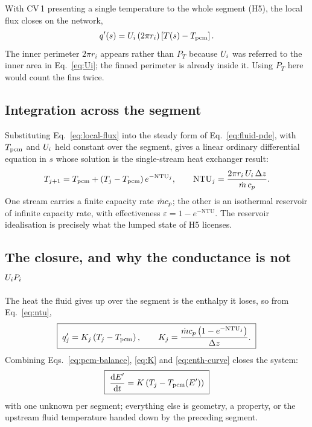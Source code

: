 With CV\,1 presenting a single temperature to the whole segment (H5), the local
flux closes on the network,
\begin{equation}
  q'(s) = U_{i}\,(2\pi r_{i})\left[T(s)-T_{\mathrm{pcm}}\right].
  \label{eq:local-flux}
\end{equation}
The inner perimeter $2\pi r_{i}$ appears rather than $P_{T}$ because $U_{i}$ was
referred to the inner area in Eq.~\eqref{eq:Ui}; the finned perimeter is already
inside it. Using $P_{T}$ here would count the fins twice.

\subsection{Integration across the segment}

Substituting Eq.~\eqref{eq:local-flux} into the steady form of
Eq.~\eqref{eq:fluid-pde}, with $T_{\mathrm{pcm}}$ and $U_{i}$ held constant over the segment,
gives a linear ordinary differential equation in $s$ whose solution is the
single-stream heat exchanger result:
\begin{equation}
  T_{j+1} = T_{\mathrm{pcm}} + \left(T_{j}-T_{\mathrm{pcm}}\right)e^{-\mathrm{NTU}_{j}},
  \qquad
  \mathrm{NTU}_{j} = \frac{2\pi r_{i}\,U_{i}\,\Delta z}{\dot m\,c_{p}}.
  \label{eq:ntu}
\end{equation}
One stream carries a finite capacity rate $\dot m c_{p}$; the other is an
isothermal reservoir of infinite capacity rate, with effectiveness
$\varepsilon=1-e^{-\mathrm{NTU}}$. The reservoir idealisation is precisely what
the lumped state of H5 licenses.

\subsection{The closure, and why the conductance is not $U_{i} P_{i}$}

The heat the fluid gives up over the segment is the enthalpy it loses, so from
Eq.~\eqref{eq:ntu},
\begin{equation}
  \boxed{\;
  q'_{j} = K_{j}\left(T_{j}-T_{\mathrm{pcm}}\right),
  \qquad
  K_{j} = \frac{\dot m c_{p}\left(1-e^{-\mathrm{NTU}_{j}}\right)}{\Delta z}.
  \;}
  \label{eq:K}
\end{equation}
Combining Eqs.~\eqref{eq:pcm-balance}, \eqref{eq:K} and \eqref{eq:enth-curve}
closes the system:
\begin{equation}
  \boxed{\;
  \frac{\mathrm{d}E'}{\mathrm{d}t}
  = K\left(T_{j}-T_{\mathrm{pcm}}(E')\right)
  \;}
  \label{eq:ode}
\end{equation}
with one unknown per segment; everything else is geometry, a property, or the
upstream fluid temperature handed down by the preceding segment.

